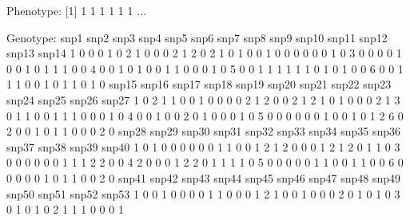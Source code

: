 \documentclass{article}
\begin{document}
\begin{Schunk}
\begin{Soutput}
Phenotype:
[1] 1 1 1 1 1 1
...

Genotype:
  snp1 snp2 snp3 snp4 snp5 snp6 snp7 snp8 snp9 snp10 snp11 snp12 snp13 snp14
1    0    0    0    1    0    2    1    0    0     0     2     1     2     0
2    1    0    1    0    0    1    0    0    0     0     0     0     1     0
3    0    0    0    0    1    0    0    1    0     1     1     1     0     0
4    0    0    1    0    1    0    0    1    1     0     0     0     1     0
5    0    0    1    1    1    1    1    1    0     1     0     1     0     0
6    0    0    1    1    1    0    0    1    0     1     1     0     1     0
  snp15 snp16 snp17 snp18 snp19 snp20 snp21 snp22 snp23 snp24 snp25 snp26 snp27
1     0     2     1     1     0     0     1     0     0     0     0     2     1
2     0     0     2     1     2     1     0     1     0     0     0     2     1
3     0     1     1     0     0     1     1     1     0     0     0     1     0
4     0     0     1     0     0     2     0     1     0     0     0     1     0
5     0     0     0     0     0     0     1     0     0     1     0     1     2
6     0     2     0     0     1     0     1     1     0     0     0     2     0
  snp28 snp29 snp30 snp31 snp32 snp33 snp34 snp35 snp36 snp37 snp38 snp39 snp40
1     0     1     0     0     0     0     0     0     1     1     0     0     1
2     1     2     0     0     0     1     2     1     2     0     1     1     0
3     0     0     0     0     0     0     1     1     1     2     2     0     0
4     2     0     0     0     1     2     2     0     1     1     1     1     0
5     0     0     0     0     0     1     1     0     0     1     1     0     0
6     0     0     0     0     0     1     0     1     1     0     0     2     0
  snp41 snp42 snp43 snp44 snp45 snp46 snp47 snp48 snp49 snp50 snp51 snp52 snp53
1     0     0     1     0     0     0     0     1     1     0     0     0     1
2     1     0     0     1     0     0     0     2     0     1     0     1     0
3     0     1     0     1     0     2     1     1     1     0     0     0     1

\end{Soutput}
\end{Schunk}
\end{document}
